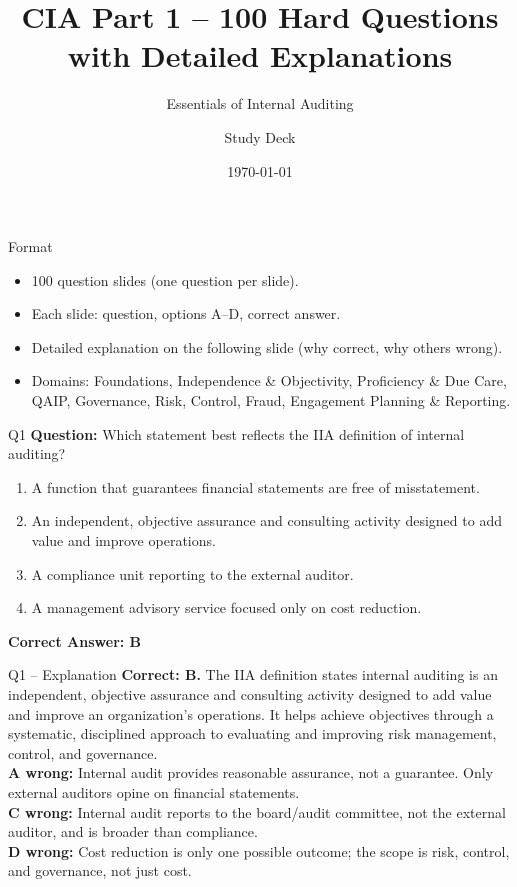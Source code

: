 \documentclass[aspectratio=169,10pt]{beamer}
\title{CIA Part 1 -- 100 Hard Questions with Detailed Explanations}
\subtitle{Essentials of Internal Auditing}
\author{Study Deck}
\date{\today}
\begin{document}
	
	\begin{frame}
		\titlepage
	\end{frame}
	
	\begin{frame}{Format}
		\begin{itemize}
			\item 100 question slides (one question per slide).
			\item Each slide: question, options A--D, correct answer.
			\item Detailed explanation on the following slide (why correct, why others wrong).
			\item Domains: Foundations, Independence \& Objectivity, Proficiency \& Due Care,
			QAIP, Governance, Risk, Control, Fraud, Engagement Planning \& Reporting.
		\end{itemize}
	\end{frame}
	
	\begin{frame}[t]{Q1}
		\small
		\textbf{Question:} Which statement best reflects the IIA definition of internal auditing?
		\begin{enumerate}[label=\Alph*.,itemsep=1pt,topsep=2pt]
			\item A function that guarantees financial statements are free of misstatement.
			\item An independent, objective assurance and consulting activity designed to add value and improve operations.
			\item A compliance unit reporting to the external auditor.
			\item A management advisory service focused only on cost reduction.
		\end{enumerate}
		\vspace{4pt}
		\textbf{Correct Answer: B}
	\end{frame}
	
	\begin{frame}[t]{Q1 -- Explanation}
		\small
		\textbf{Correct: B.} The IIA definition states internal auditing is an independent, objective assurance and consulting activity designed to add value and improve an organization's operations. It helps achieve objectives through a systematic, disciplined approach to evaluating and improving risk management, control, and governance. \\[4pt]
		\textbf{A wrong:} Internal audit provides reasonable assurance, not a guarantee. Only external auditors opine on financial statements. \\[2pt]
		\textbf{C wrong:} Internal audit reports to the board/audit committee, not the external auditor, and is broader than compliance. \\[2pt]
		\textbf{D wrong:} Cost reduction is only one possible outcome; the scope is risk, control, and governance, not just cost.
	\end{frame}
	
\end{document}
